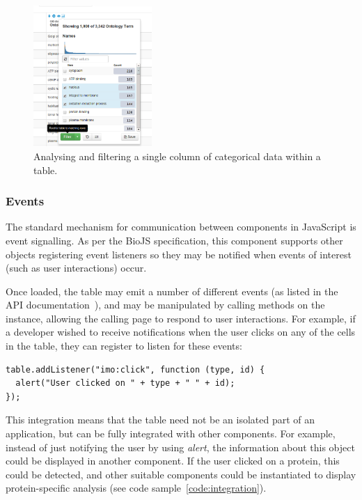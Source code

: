 \documentclass[10pt,a4paper,twocolumn]{article}
\begin{document}
\begin{figure}[t]
\centering
\includegraphics[width=0.4\textwidth]{category-column-summary.png}
\caption{
    \label{fig:cat-column-summary}
    Analysing and filtering a single column of categorical data within a table.
}
\end{figure}

\subsubsection*{Events}

The standard mechanism for communication between components in JavaScript is
event signalling. As per the BioJS specification, this component supports other
objects registering event listeners so they may be notified when events of
interest (such as user interactions) occur.

Once loaded, the table may emit a number of different events (as listed in the
API documentation~\cite{site:biojs-doc}), and may be manipulated by calling 
methods on the instance, allowing the calling page to respond to 
user interactions. For example, if a developer wished to receive notifications 
when the user clicks on any of the cells in the table, they can register to 
listen for these events:

\begin{lstlisting}[caption={Adding an Event Listener}, label={code:add-listener}]
table.addListener("imo:click", function (type, id) {
  alert("User clicked on " + type + " " + id);
});
\end{lstlisting}

This integration means that the table need not be an isolated part of an
application, but can be fully integrated with other components. For example,
instead of just notifying the user by using \emph{alert}, the information about
this object could be displayed in another component. If the user clicked on a
protein, this could be detected, and other suitable components could be
instantiated to display protein-specific analysis (see code
sample~\ref{code:integration}).
\end{document}
